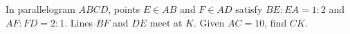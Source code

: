 In parallelogram $ABCD$, points $E\in AB$ and $F\in AD$ satisfy $BE:EA=1:2$ and $AF:FD=2:1$. Lines $BF$ and $DE$ meet at $K$. Given $AC=10$, find $CK$.
